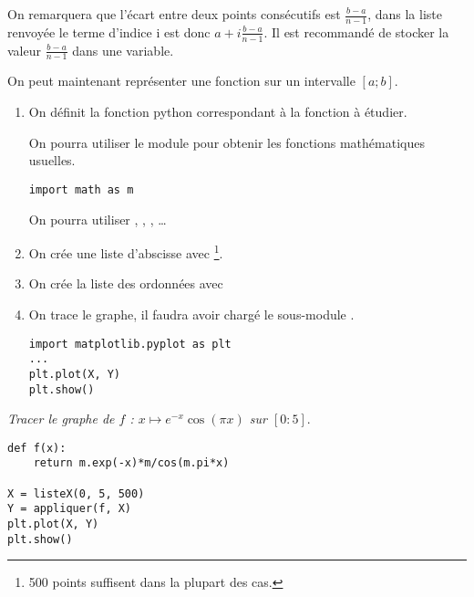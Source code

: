 On remarquera que l'écart entre deux points consécutifs est $\frac{b-a}{n-1}$, dans la liste renvoyée le terme d'indice i est donc
$a + i\frac{b-a}{n-1}$. Il est recommandé de stocker la valeur $\frac{b-a}{n-1}$ dans une variable.

\bigskip

On peut maintenant représenter une fonction sur un intervalle $[a;b]$.

\begin{enumerate}
\item On définit la fonction python correspondant à la fonction à étudier.

On pourra utiliser le module  pour obtenir les fonctions mathématiques usuelles.
\begin{lstlisting}
import math as m
\end{lstlisting}
On pourra utiliser , , , \dots

\item On crée une liste d'abscisse avec \footnote{500 points suffisent dans la plupart des cas.}.
\item On crée la liste des ordonnées avec 
\item On trace le graphe, il faudra avoir chargé le sous-module .
\begin{lstlisting}
import matplotlib.pyplot as plt
...    
plt.plot(X, Y)
plt.show()
\end{lstlisting}
\end{enumerate}
\begin{Exercise}\it
Tracer le graphe de $f$ : $x\mapsto e^{-x}\cos(\pi x)$ sur $[0:5].$
\end{Exercise}
\begin{Answer}
\begin{lstlisting}
def f(x):
    return m.exp(-x)*m/cos(m.pi*x)
    
X = listeX(0, 5, 500)
Y = appliquer(f, X)
plt.plot(X, Y)
plt.show()
\end{lstlisting}
\end{Answer}
\medskip

